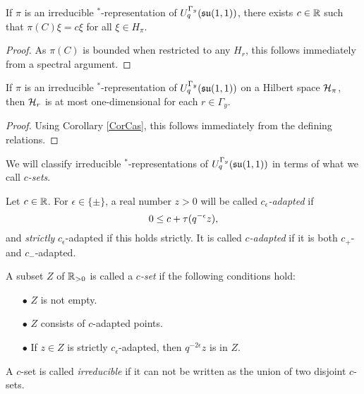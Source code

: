 


\begin{Lem}\label{CorCas} If $\pi$ is an irreducible $^*$-representation of $U_q^{\Gamma_y}(\mathfrak{su}(1,1))$, there exists $c\in \mathbb{R}$ such that $\pi(C)\xi = c\xi$ for all $\xi \in H_{\pi}$. 
\end{Lem} 
\begin{proof} As $\pi(C)$ is bounded when restricted to any $H_r$, this follows immediately from a spectral argument. 
\end{proof} 

\begin{Cor}\label{CorOneDim} If $\pi$ is an irreducible $^*$-representation of $U_q^{\Gamma_y}(\mathfrak{su}(1,1))$ on a Hilbert space $\mathcal{H}_{\pi}$, then $\mathcal{H}_r$ is at most one-dimensional for each $r\in \Gamma_y$. %
\end{Cor} 
\begin{proof} 
Using Corollary \ref{CorCas}, this follows immediately from the defining relations.
\end{proof}

We will classify irreducible $^*$-representations of $U_q^{\Gamma_y}(\mathfrak{su}(1,1))$ in terms of what we call \emph{$c$-sets}.  

\begin{Def}\label{DefAdapt} Let $c\in\mathbb{R}$. For $\epsilon \in \{\pm\}$, a real number $z>0$ will be called \emph{$c_{\epsilon}$-adapted} if \begin{equation}\label{EqAd+}  0 \leq c+ \operatorname{\tau}(q^{-\epsilon}z),\end{equation} and \emph{strictly} $c_{\epsilon}$-adapted if this holds strictly. It is called \emph{$c$-adapted} if it is both $c_+$- and $c_-$-adapted. 

A subset $Z$ of $\mathbb{R}_{>0}$ is called a \emph{$c$-set} if the following conditions hold: \begin{itemize} 
\item[$\bullet$] $Z$ is not empty.
\item[$\bullet$] $Z$ consists of $c$-adapted points.
\item[$\bullet$] If $z\in Z$ is strictly $c_{\epsilon}$-adapted, then $q^{-2\epsilon}z$ is in $Z$.
\end{itemize}
A $c$-set is called \emph{irreducible} if it can not be written as the union of two disjoint $c$-sets.
\end{Def}

